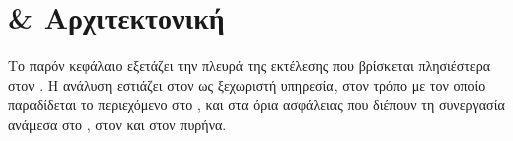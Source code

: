 \chapter{ \&  Αρχιτεκτονική}
\label{ch:scorm_player_client}

Το παρόν κεφάλαιο εξετάζει την πλευρά της εκτέλεσης που βρίσκεται πλησιέστερα στον . Η ανάλυση εστιάζει στον  ως ξεχωριστή υπηρεσία, στον τρόπο με τον οποίο παραδίδεται το περιεχόμενο στο , και στα όρια ασφάλειας που διέπουν τη συνεργασία ανάμεσα στο , στον  και στον  πυρήνα.




